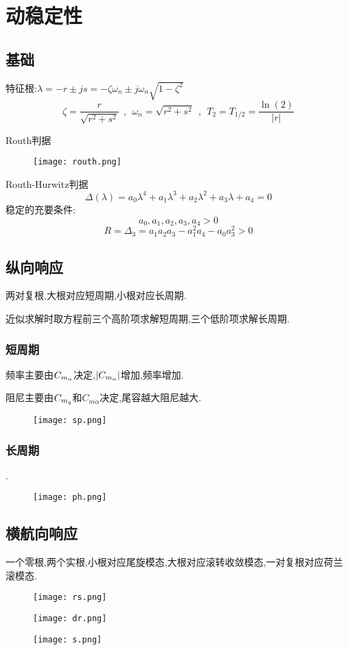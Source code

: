 \chapter{动稳定性}
\section{基础}
特征根:$\lambda=-r\pm js=-\zeta\omega_n\pm j\omega_n\sqrt{1-\zeta^2}$
$$\zeta=\frac{r}{\sqrt{r^2+s^2}}\ \ ,\ \ \omega_n=\sqrt{r^2+s^2}\ \ ,\ \ T_2=T_{1/2}=\frac{\ln(2)}{|r|}$$

Routh判据
\begin{figure}[!h]
\centering
\texttt{[image: routh.png]}
\end{figure}

Routh-Hurwitz判据
$$\Delta(\lambda)=a_0\lambda^4+a_1\lambda^3+a_2\lambda^2+a_3\lambda+a_4=0$$
稳定的充要条件:
$$a_0,a_1,a_2,a_3,a_4>0$$
$$R=\Delta_3=a_1a_2a_3-a_1^2a_4-a_0a_3^2>0$$

\section{纵向响应}
两对复根,大根对应短周期,小根对应长周期.

近似求解时取方程前三个高阶项求解短周期,三个低阶项求解长周期.
\subsection{短周期}
频率主要由${C_{m_\alpha}}$决定,$|{C_{m_\alpha}}|$增加,频率增加.

阻尼主要由$C_{m_q}$和$C_{m\dot{\alpha}}$决定,尾容越大阻尼越大.
\begin{figure}[!h]
\centering
\texttt{[image: sp.png]}
\end{figure}

\subsection{长周期}
.
\begin{figure}[!h]
\centering
\texttt{[image: ph.png]}
\end{figure}

\section{横航向响应}
一个零根,两个实根,小根对应尾旋模态,大根对应滚转收敛模态,一对复根对应荷兰滚模态.
\begin{figure}[!h]
\centering
\texttt{[image: rs.png]}
\end{figure}
\begin{figure}[!h]
\centering
\texttt{[image: dr.png]}
\end{figure}
\begin{figure}[!h]
\centering
\texttt{[image: s.png]}
\end{figure}

\endinput
